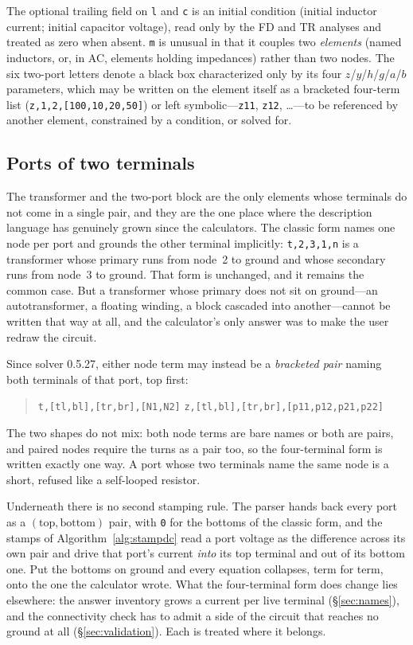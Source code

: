 \documentclass[11pt,oneside]{report}
\newcommand{\code}[1]{\texttt{#1}}
\begin{document}
The optional trailing field on \code{l} and \code{c} is an initial
condition (initial inductor current; initial capacitor voltage), read
only by the FD and TR analyses and treated as zero when absent.
\code{m} is unusual in that it couples two \emph{elements} (named
inductors, or, in AC, elements holding impedances) rather than two
nodes. The six two-port letters denote a black box characterized only
by its four $z$/$y$/$h$/$g$/$a$/$b$ parameters, which may be written on
the element itself as a bracketed four-term list
(\code{z,1,2,[100,10,20,50]}) or left symbolic---\code{z11},
\code{z12}, \ldots---to be referenced by another element, constrained
by a condition, or solved for.

\subsection{Ports of two terminals}
\label{sec:fourterminal}

The transformer and the two-port block are the only elements whose
terminals do not come in a single pair, and they are the one place
where the description language has genuinely grown since the
calculators. The classic form names one node per port and grounds the
other terminal implicitly: \code{t,2,3,1,n} is a transformer whose
primary runs from node~2 to ground and whose secondary runs from
node~3 to ground. That form is unchanged, and it remains the common
case. But a transformer whose primary does not sit on ground---an
autotransformer, a floating winding, a block cascaded into
another---cannot be written that way at all, and the calculator's only
answer was to make the user redraw the circuit.

Since solver 0.5.27, either node term may instead be a \emph{bracketed
pair} naming both terminals of that port, top first:

\begin{quote}
\code{t,[tl,bl],[tr,br],[N1,N2]} \qquad
\code{z,[tl,bl],[tr,br],[p11,p12,p21,p22]}
\end{quote}

\noindent The two shapes do not mix: both node terms are bare names or
both are pairs, and paired nodes require the turns as a pair too, so
the four-terminal form is written exactly one way. A port whose two
terminals name the same node is a short, refused like a self-looped
resistor.

Underneath there is no second stamping rule. The parser hands back
every port as a $(\mathrm{top},\mathrm{bottom})$ pair, with \code{0}
for the bottoms of the classic form, and the stamps of
Algorithm~\ref{alg:stampdc} read a port voltage as the difference
across its own pair and drive that port's current \emph{into} its top
terminal and out of its bottom one. Put the bottoms on ground and
every equation collapses, term for term, onto the one the calculator
wrote. What the four-terminal form does change lies elsewhere: the
answer inventory grows a current per live terminal
(\S\ref{sec:names}), and the connectivity check has to admit a side of
the circuit that reaches no ground at all (\S\ref{sec:validation}).
Each is treated where it belongs.
\end{document}
